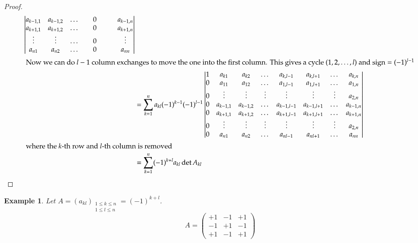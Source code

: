 \documentclass[a4paper]{article}
\newcounter{lecref}[section]
\numberwithin{lecref}{section}
\newtheorem{example}[lecref]{Example}
\DeclareMathOperator{\sign}{sign}
\begin{document}
\begin{proof}
\begin{align*}
\begin{vmatrix}
      a_{k-1,1} & a_{k-1,2} & \dots &           & 0 &           &       & a_{k-1,n} \\
      a_{k+1,1} & a_{k+1,2} & \dots &           & 0 &           &       & a_{k+1,n} \\
      \vdots & \vdots & \dots &           & 0 &           &       & \vdots \\
      a_{n1} & a_{n2} & \dots &           & 0 &           &       & a_{nn}
    \end{vmatrix} \\
    \intertext{
      Now we can do $l-1$ column exchanges to move the one into the first column.
      This gives a cycle $(1, 2, \dots, l)$ and $\sign = (-1)^{l-1}$
    }
    &= \sum_{k=1}^n a_{kl} (-1)^{k-1} (-1)^{l-1}   \begin{vmatrix}
      1 & a_{k1} & a_{k2} & \dots & a_{k,l-1} & a_{k,l+1} & \dots & a_{k,n} \\
      0 & a_{11} & a_{12} & \dots & a_{1,l-1} & a_{1,l+1} & \dots & a_{1,n} \\
      0 & \vdots & \vdots & \vdots& \vdots    & \vdots    & \vdots& a_{2,n} \\
      0 & a_{k-1,1} & a_{k-1,2} & \dots & a_{k-1,l-1} & a_{k-1,l+1} & \dots & a_{k-1,n} \\
      0 & a_{k+1,1} & a_{k+1,2} & \dots & a_{k+1,l-1} & a_{k+1,l+1} & \dots & a_{k+1,n} \\
      0 & \vdots & \vdots & \vdots& \vdots    & \vdots    & \vdots& a_{2,n} \\
      0 & a_{n1} & a_{n2} & \dots & a_{nl-1} & a_{nl+1} & \dots & a_{nn} \\
    \end{vmatrix} \\
    \intertext{
      where the $k$-th row and $l$-th column is removed
    }
    &= \sum_{k=1}^n (-1)^{k+l} a_{kl} \det{A_{kl}}
  \end{align*}
\end{proof}

\begin{example} %
  Let $A = (a_{kl})_{\substack{1 \leq k \leq n \\ 1 \leq l \leq n}} = (-1)^{k+l}$.
  \[
    A = \begin{pmatrix}
      +1 & -1 & +1 \\
      -1 & +1 & -1 \\
      +1 & -1 & +1
    \end{pmatrix}
  \]
\end{example}
\end{document}

